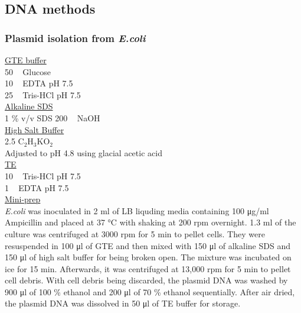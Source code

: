 \subsection{DNA methods}
\subsubsection{Plasmid isolation from \textit{E.coli}}

\underline{GTE buffer}\\
50 \si{\milli\Molar} Glucose \\
10 \si{\milli\Molar} EDTA pH 7.5 \\
25 \si{\milli\Molar} Tris-HCl pH 7.5 \\

\underline{Alkaline SDS}\\
 1 \% v/v SDS
200 \si{\milli\Molar} NaOH\\

\underline{High Salt Buffer}\\
2.5 \si{\Molar} C$_{2}$H$_{3}$KO$_{2}$ \\
Adjusted to pH 4.8 using glacial acetic acid\\

\underline{TE}\\
10 \si{\milli\Molar} Tris-HCl pH 7.5\\
1 \si{\milli\Molar} EDTA pH 7.5\\

\underline{Mini-prep}\\
\textit{E.coli} was inoculated in 2 \si{\milli\litre} of LB liquding media containing 100 \si{\micro\gram/\milli\litre} Ampicillin and placed at 37 \si{\celsius} with shaking at 200 rpm overnight. 1.3 \si{\milli\litre} of the culture was centrifuged at 3000 rpm for 5 \si{\minute} to pellet cells. They were resuspended in 100 \si{\micro\litre} of GTE and then mixed with 150 \si{\micro\litre} of alkaline SDS and 150 \si{\micro\litre} of high salt buffer for being broken open. The mixture was incubated on ice for 15 \si{\minute}. Afterwards, it was centrifuged at 13,000 rpm for 5 \si{\minute} to pellet cell debris. With cell debris being discarded, the plasmid DNA was washed by 900 \si{\micro\litre} of 100 \% ethanol and 200 \si{\micro\litre} of 70 \% ethanol sequentially. After air dried, the plasmid DNA was dissolved in 50 \si{\micro\litre} of TE buffer for storage. \\

